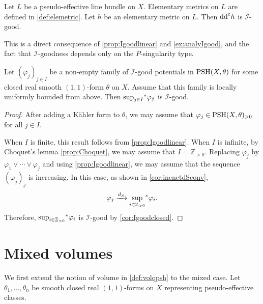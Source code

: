 \begin{example}\label{ex:eleIgood}
    Let $L$ be a pseudo-effective line bundle on $X$. Elementary metrics on $L$ are defined in \cref{def:elemetric}. Let $h$ be an elementary metric on $L$. Then $\ddc h$ is $\mathcal{I}$-good.

    This is a direct consequence of \cref{prop:Igoodlinear} and \cref{ex:analyIgood}, and the fact that $\mathcal{I}$-goodness depends only on the $P$-singularity type.
\end{example}

\begin{proposition}\label{prop:Igoodsup}
    Let $(\varphi_j)_{j\in I}$ be a non-empty family of $\mathcal{I}$-good potentials in $\PSH(X,\theta)$ for some closed real smooth $(1,1)$-form $\theta$ on $X$. Assume that this family is locally uniformly bounded from above. Then $\uscsup[j\in I] \varphi_j$ is $\mathcal{I}$-good.
\end{proposition}
\begin{proof}
    After adding a K\"ahler form to $\theta$, we may assume that $\varphi_j\in \PSH(X,\theta)_{>0}$ for all $j\in I$.

    When $I$ is finite, this result follows from \cref{prop:Igoodlinear}.
    When $I$ is infinite, by Choquet's lemma \cref{prop:Choquet}, we may assume that $I=\mathbb{Z}_{>0}$. Replacing $\varphi_j$ by $\varphi_1\lor\cdots\lor\varphi_j$ and using \cref{prop:Igoodlinear}, we may assume that the sequence $(\varphi_j)_j$ is increasing. In this case, as shown in \cref{cor:incnetdSconv},
    \[
        \varphi_j\xrightarrow{d_S}\uscsup[ i\in \mathbb{Z}_{>0}] \varphi_i.
    \]
    Therefore, $\uscsup[i\in \mathbb{Z}_{>0}] \varphi_i$ is $\mathcal{I}$-good by \cref{cor:Igoodclosed}.
\end{proof}

\section{Mixed volumes}\label{sec:mix_vol}

We first extend the notion of volume in \cref{def:volqpsh} to the mixed case.
Let $\theta_1,\ldots,\theta_n$ be smooth closed real $(1,1)$-forms on $X$ representing pseudo-effective classes.


